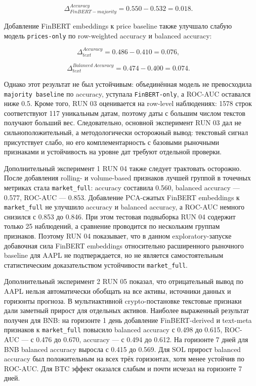 \[
\Delta_{FinBERT-majority}^{Accuracy} = 0.550 - 0.532 = 0.018.
\]

Добавление FinBERT embeddings к price baseline также улучшало слабую модель \texttt{prices-only} по row-weighted accuracy и balanced accuracy:

\[
\Delta_{text}^{Accuracy} = 0.486 - 0.410 = 0.076,
\]

\[
\Delta_{text}^{Balanced\ Accuracy} = 0.474 - 0.400 = 0.074.
\]

Однако этот результат не был устойчивым: объединённая модель не превосходила \texttt{majority baseline} по accuracy, уступала \texttt{FinBERT-only}, а ROC-AUC оставался ниже 0.5. Кроме того, RUN 03 оценивается на row-level наблюдениях: 1578 строк соответствуют 117 уникальным датам, поэтому даты с большим числом текстов получают больший вес. Следовательно, основной эксперимент RUN 03 дал не сильноположительный, а методологически осторожный вывод: текстовый сигнал присутствует слабо, но его комплементарность с базовыми рыночными признаками и устойчивость на уровне дат требуют отдельной проверки.

Дополнительный эксперимент 1 RUN 04 также следует трактовать осторожно. После добавления rolling- и volume-based признаков лучшей группой в точечных метриках стала \texttt{market\_full}: accuracy составила 0.560, balanced accuracy --- 0.577, ROC-AUC --- 0.853. Добавление PCA-сжатых FinBERT embeddings к \texttt{market\_full} не улучшило accuracy и balanced accuracy, а ROC-AUC немного снизился с 0.853 до 0.846. При этом тестовая подвыборка RUN 04 содержит только 25 наблюдений, а сравнение проводится по нескольким группам признаков. Поэтому RUN 04 показывает, что в данном exploratory-запуске добавочная сила FinBERT embeddings относительно расширенного рыночного baseline для AAPL не подтверждается, но не является самостоятельным статистическим доказательством устойчивости \texttt{market\_full}.

Дополнительный эксперимент 2 RUN 05 показал, что отрицательный вывод по AAPL нельзя автоматически обобщать на все активы, источники данных и горизонты прогноза. В мультиактивной crypto-постановке текстовые признаки дали заметный прирост для отдельных активов. Наиболее выраженный результат получен для BNB: на горизонте 1 день добавление FinBERT-derived и text-meta признаков к \texttt{market\_full} повысило balanced accuracy с 0.498 до 0.615, ROC-AUC --- с 0.476 до 0.670, accuracy --- с 0.494 до 0.612. На горизонте 7 дней для BNB balanced accuracy выросла с 0.415 до 0.569. Для SOL прирост balanced accuracy был положительным на всех трёх горизонтах, хотя менее устойчив по ROC-AUC. Для BTC эффект оказался слабым и почти исчезал на горизонте 7 дней.

